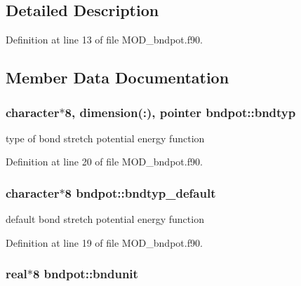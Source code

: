 \subsection{Detailed Description}


Definition at line 13 of file M\-O\-D\-\_\-bndpot.\-f90.



\subsection{Member Data Documentation}
\hypertarget{classbndpot_a35a22f0f0d4da54daec518fa1f57f2be}{
\subsubsection[{bndtyp}]{\setlength{\rightskip}{0pt plus 5cm}character$\ast$8, dimension(\-:), pointer bndpot\-::bndtyp}}\label{classbndpot_a35a22f0f0d4da54daec518fa1f57f2be}


type of bond stretch potential energy function 



Definition at line 20 of file M\-O\-D\-\_\-bndpot.\-f90.

\hypertarget{classbndpot_abb6bababce405b897c195116b5b8aa5a}{
\subsubsection[{bndtyp\-\_\-default}]{\setlength{\rightskip}{0pt plus 5cm}character$\ast$8 bndpot\-::bndtyp\-\_\-default}}\label{classbndpot_abb6bababce405b897c195116b5b8aa5a}


default bond stretch potential energy function 



Definition at line 19 of file M\-O\-D\-\_\-bndpot.\-f90.

\hypertarget{classbndpot_a4cffe9af16847e8aec14989ac344d0e7}{
\subsubsection[{bndunit}]{\setlength{\rightskip}{0pt plus 5cm}real$\ast$8 bndpot\-::bndunit}}\label{classbndpot_a4cffe9af16847e8aec14989ac344d0e7}


